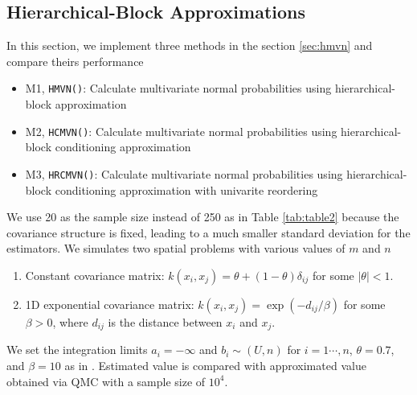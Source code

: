\subsection{Hierarchical-Block Approximations}

In this section, we implement three methods in the section \ref{sec:hmvn} and compare theirs performance
\begin{itemize}
    \item M1, \texttt{HMVN()}: Calculate multivariate normal probabilities using hierarchical-block approximation
    \item M2, \texttt{HCMVN()}: Calculate multivariate normal probabilities using hierarchical-block conditioning approximation
    \item M3, \texttt{HRCMVN()}: Calculate multivariate normal probabilities using hierarchical-block conditioning approximation with univarite reordering
\end{itemize}

We use 20 as the sample size instead of 250 as in Table \ref{tab:table2} because the covariance structure is ﬁxed, leading to a much smaller standard deviation for the estimators. We simulates two spatial problems with various values of $m$ and $n$

\begin{enumerate}
	\item Constant covariance matrix: $k(x_i, x_j) = \theta + (1-\theta)\delta_{ij}$ for some $|\theta| < 1$.
	\item 1D exponential covariance matrix: $k(x_i, x_j) = \exp(-d_{ij}/\beta)$ for some $\beta > 0$, where $d_{ij}$ is the distance between $x_i$ and $x_j$.
\end{enumerate}

We set the integration limits $a_i=-\infty$ and $b_i\sim(U,n)$ for $i=1\cdots,n$, $\theta=0.7$, and $\beta=10$ as in \citet{cao2019hierarchical}. Estimated value is compared with approximated value obtained via QMC with a sample size of $10^4$.

			
